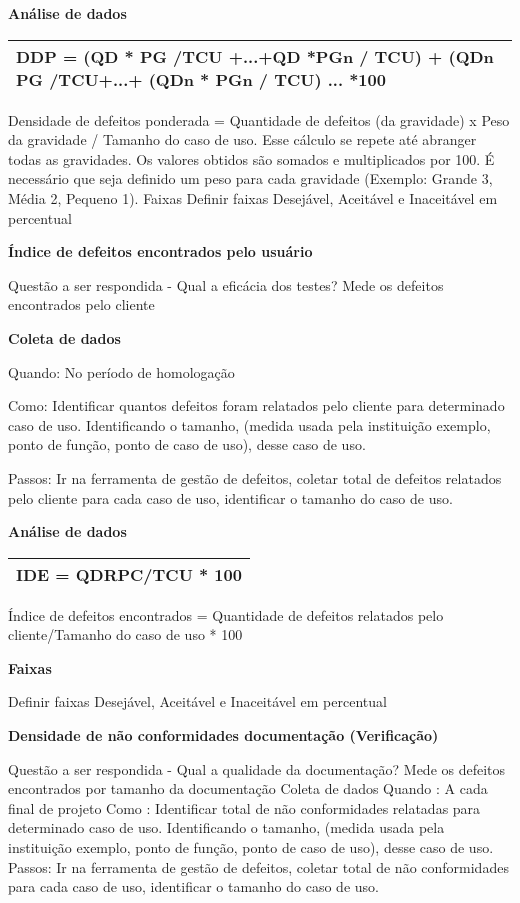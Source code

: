 \textbf{Análise de dados}

\begin{table}[!ht]
\centering
\begin{tabular}{|p{130mm}|}
\hline
DDP = (QD * PG /TCU +...+QD *PGn / TCU) + (QDn PG /TCU+...+ (QDn * PGn / TCU) ... *100 \\ 
\hline
\end{tabular}
\end{table}

Densidade de defeitos ponderada = Quantidade de defeitos (da gravidade) x Peso da gravidade / Tamanho do caso de uso. Esse cálculo se repete até abranger todas as gravidades. Os valores obtidos são somados e multiplicados por 100. É necessário que seja definido um peso para cada gravidade (Exemplo: Grande 3, Média 2, Pequeno 1). Faixas Definir faixas Desejável, Aceitável e Inaceitável em percentual

\textbf{Índice de defeitos encontrados pelo usuário}

Questão a ser respondida - Qual a eficácia dos testes? Mede os defeitos encontrados pelo cliente

\textbf{Coleta de dados}

Quando: No período de homologação 

Como: Identificar quantos defeitos foram relatados pelo cliente para determinado caso de uso. Identificando o tamanho, (medida usada pela instituição exemplo, ponto de função, ponto de caso de uso), desse caso de uso. 

Passos: Ir na ferramenta de gestão de defeitos, coletar total de defeitos relatados pelo cliente para cada caso de uso, identificar o tamanho do caso de uso.



\textbf{Análise de dados}

\begin{tabular}{|l|}
\hline
IDE = QDRPC/TCU * 100 \\ 
\hline
\end{tabular}

Índice de defeitos encontrados = Quantidade de defeitos relatados pelo cliente/Tamanho do caso de uso * 100

\textbf{Faixas}

Definir faixas Desejável, Aceitável e Inaceitável em percentual

\textbf{Densidade de não conformidades documentação (Verificação)}

Questão a ser respondida - Qual a qualidade da documentação? Mede os defeitos encontrados por tamanho da documentação Coleta de dados Quando : A cada final de projeto Como : Identificar total de não conformidades relatadas para determinado caso de uso. Identificando o tamanho, (medida usada pela instituição exemplo, ponto de função, ponto de caso de uso), desse caso de uso. Passos: Ir na ferramenta de gestão de defeitos, coletar total de não conformidades para cada caso de uso, identificar o tamanho do caso de uso.

